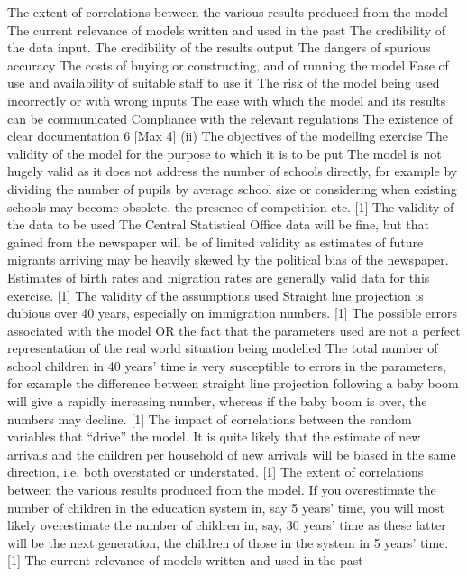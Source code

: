 The extent of correlations between the various results produced from the model 
The current relevance of models written and used in the past 
The credibility of the data input. 
The credibility of the results output 
The dangers of spurious accuracy 
The costs of buying or constructing, and of running the model 
Ease of use and availability of suitable staff to use it 
The risk of the model being used incorrectly or with wrong inputs 
The ease with which the model and its results can be communicated 
Compliance with the relevant regulations 
The existence of clear documentation
6
[Max 4]
(ii)
The objectives of the modelling exercise
The validity of the model for the purpose to which it is to be put
The model is not hugely valid as it does not address the number of schools directly,
for example by dividing the number of pupils by average school size or considering
when existing schools may become obsolete, the presence of competition etc.
[1]
The validity of the data to be used
The Central Statistical Office data will be fine, but that gained from the newspaper
will be of limited validity as estimates of future migrants arriving may be heavily
skewed by the political bias of the newspaper. Estimates of birth rates and migration
rates are generally valid data for this exercise.
[1]
The validity of the assumptions used
Straight line projection is dubious over 40 years, especially on immigration numbers.
[1]
The possible errors associated with the model OR the fact that the parameters
used are not a perfect representation of the real world situation being modelled
The total number of school children in 40 years’ time is very susceptible to errors in
the parameters, for example the difference between straight line projection following a
baby boom will give a rapidly increasing number, whereas if the baby boom is over,
the numbers may decline.
[1]
The impact of correlations between the random variables that “drive” the model.
It is quite likely that the estimate of new arrivals and the children per household of
new arrivals will be biased in the same direction, i.e. both overstated or understated.
[1]
The extent of correlations between the various results produced from the model.
If you overestimate the number of children in the education system in, say 5 years’
time, you will most likely overestimate the number of children in, say, 30 years’ time
as these latter will be the next generation, the children of those in the system
in 5 years’ time.
[1]
The current relevance of models written and used in the past
